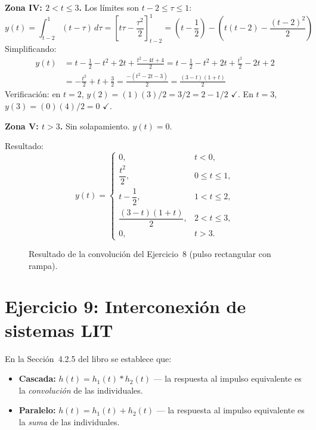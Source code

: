\documentclass[10pt,a4paper]{article}
\begin{document}
	\textbf{Zona IV: $2 < t \leq 3$.} Los límites son $t-2 \leq \tau \leq 1$:
	\[
	y(t) = \int_{t-2}^1 (t-\tau)\,d\tau = \left[t\tau - \frac{\tau^2}{2}\right]_{t-2}^1 = \left(t - \frac{1}{2}\right) - \left(t(t-2) - \frac{(t-2)^2}{2}\right)
	\]
	Simplificando:
	\begin{align*}
	y(t) &= t - \frac{1}{2} - t^2 + 2t + \frac{t^2 - 4t + 4}{2} = t - \frac{1}{2} - t^2 + 2t + \frac{t^2}{2} - 2t + 2 \\
	&= -\frac{t^2}{2} + t + \frac{3}{2} = \frac{-(t^2 - 2t - 3)}{2} = \frac{(3-t)(1+t)}{2}
	\end{align*}
	Verificación: en $t=2$, $y(2) = (1)(3)/2 = 3/2 = 2 - 1/2$ $\checkmark$. En $t=3$, $y(3) = (0)(4)/2 = 0$ $\checkmark$.
	
	\textbf{Zona V: $t > 3$.} Sin solapamiento. $y(t) = 0$.
	
	Resultado:
	\[
	\boxed{y(t) = \begin{cases}
	0, & t < 0, \\[2pt]
	\dfrac{t^2}{2}, & 0 \leq t \leq 1, \\[6pt]
	t - \dfrac{1}{2}, & 1 < t \leq 2, \\[6pt]
	\dfrac{(3-t)(1+t)}{2}, & 2 < t \leq 3, \\[6pt]
	0, & t > 3.
	\end{cases}}
	\]
	
	\begin{figure}[H]
	\centering
	
	\caption{Resultado de la convolución del Ejercicio~8 (pulso rectangular con rampa).}
	\end{figure}

	\section*{Ejercicio 9: Interconexión de sistemas LIT}
	
	En la Sección~4.2.5 del libro se establece que:
	\begin{itemize}
		\item \textbf{Cascada:} $h(t) = h_1(t) * h_2(t)$ --- la respuesta al impulso equivalente es la \textit{convolución} de las individuales.
		\item \textbf{Paralelo:} $h(t) = h_1(t) + h_2(t)$ --- la respuesta al impulso equivalente es la \textit{suma} de las individuales.
	\end{itemize}
	
\end{document}
